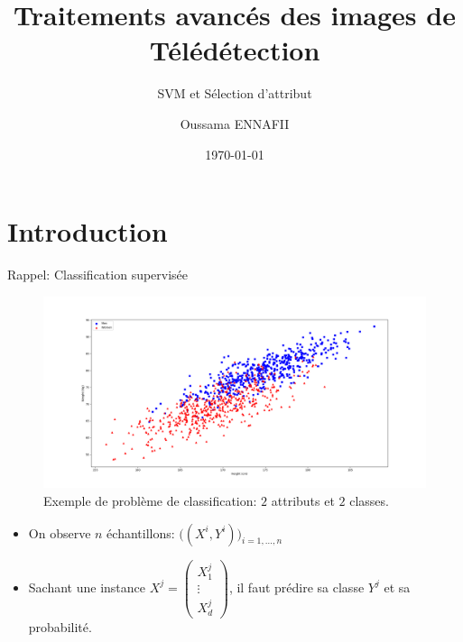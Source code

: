 \documentclass[8pt]{beamer}
\title{Traitements avancés des images de Télédétection}
\subtitle{SVM et Sélection d'attribut}
\author{Oussama ENNAFII}
\institute{ENSG}
\date{\today}
\begin{document}
	\begin{frame}[plain]
		\titlepage{}
	\end{frame}

	\section{Introduction}

	\begin{frame}{Rappel: Classification supervisée}
		\begin{figure}[H]
			\begin{center}
				\includegraphics[height=.4\textheight]{images/samples/sample_2d}
				\caption{\tiny Exemple de problème de classification: $2$ attributs et $2$ classes.}
			\end{center}
		\end{figure}
		\begin{itemize}
			\item <1-> On observe $n$ échantillons: $\big((X^i, Y^i)\big)_{i=1,\dots,n}$
			\item <2-> Sachant une instance $X^j = \begin{pmatrix}
			X_1^j\\
			\vdots \\
			X_d^j
			\end{pmatrix}$, il faut prédire sa classe $Y^j$ et sa probabilité.
		\end{itemize}
	\end{frame}
\end{document}

